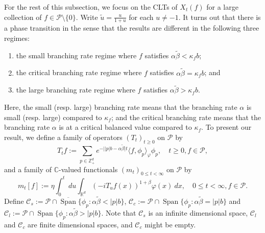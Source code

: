 \documentclass[EJP]{ejpecp} %
\begin{document}
	For the rest of this subsection, we focus on the CLTs of $X_t(f)$ for a large collection of $f\in \mathcal P\setminus \{0\}$.
	Write $\tilde u = \frac{u}{ 1+ u}$ for each $u \neq -1$.
	It turns out that there is a phase transition in the sense that the results are different in the following three 
	regimes:
\begin{enumerate}
\item
	the small branching rate regime 
	where $f$ satisfies $\alpha \tilde \beta < \kappa_f b$;
\item
  	the critical branching rate regime 
  	where $f$ satisfies $\alpha \tilde \beta = \kappa_f b$; and
\item
	the large branching rate regime 
	where $f$ satisfies $\alpha \tilde \beta > \kappa_f b$.
\end{enumerate}
	Here, %
	the small (resp. large) branching rate
	means that the branching rate $\alpha$ is small (resp. large) compared to $\kappa_f$; and the critical branching rate means that the branching rate $\alpha$ is at a critical balanced value compared to $\kappa_f$.
	To present our result, we define a family of operators $(T_t)_{t\geq 0}$ on $\mathcal P$ by
\begin{equation}
\label{eq:I:R:1}
	T_t f
  	:= \sum_{p \in \mathbb Z_+^d} e^{-\big| |p|b - \alpha \tilde \beta \big|t} \langle f, \phi_p \rangle_{\varphi} \phi_p
	,\quad t\geq 0, f\in \mathcal P,
\end{equation}
	and a family of $\mathbb C$-valued functionals $(m_t)_{0 \leq t < \infty}$ on $\mathcal P$ by
\begin{equation}
\label{eq:I:R:2}
  	m_t[f]
  	:= \eta \int_0^t ~du \int_{\mathbb R^d} (-iT_u f(x))^{1+\beta} \varphi(x) ~dx, 
  	\quad 0 \leq t< \infty, f\in \mathcal P.
\end{equation}
	Define $ \mathcal C_s := \mathcal P \cap \overline{\operatorname{Span}} \{ \phi_p: \alpha \tilde \beta < |p| b \}$, $\mathcal C_c   := \mathcal P \cap \operatorname{Span} \{ \phi_p : \alpha \tilde \beta = |p| b \}$ and $ \mathcal C_l   := \mathcal P \cap \operatorname{Span} \{ \phi_p: \alpha \tilde \beta > |p| b \}$. 
	Note that $\mathcal C_s$ is an infinite dimensional space, $ \mathcal C_l$ and $\mathcal C_c$ are finite dimensional spaces, and $\mathcal C_c$ might be empty.
\end{document}
